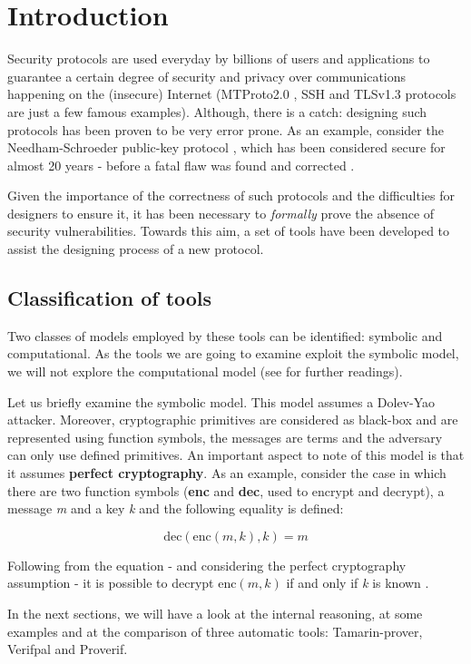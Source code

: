
\section{Introduction}
\label{section:introduction}

Security protocols are used everyday by billions of users and applications to guarantee a certain degree of security and privacy over communications happening on the (insecure) Internet (MTProto2.0 \cite{Telegram-MTProto2.0}, SSH \cite{rfc4251} and TLSv1.3 \cite{TLSv1.3_specs} protocols are just a few famous examples). Although, there is a catch: designing such protocols has been proven to be very error prone. As an example, consider the Needham-Schroeder public-key protocol \cite{NSPK}, which has been considered secure for almost 20 years - before a fatal flaw was found and corrected \cite{NSPK_LoweGavin}.

Given the importance of the correctness of such protocols and the difficulties for designers to ensure it, it has been necessary to \textit{formally} prove the absence of security vulnerabilities. Towards this aim, a set of tools have been developed to assist the designing process of a new protocol.

\subsection{Classification of tools}

Two classes of models employed by these tools can be identified: symbolic and computational. As the tools we are going to examine exploit the symbolic model, we will not explore the computational model (see \cite{ReconcilingComputationalSymbolic, SymbolicComputationalBlanchet, 10.1007/978-3-540-31987-0_12} for further readings). 

Let us briefly examine the symbolic model. This model assumes a Dolev-Yao \cite{Dolev-Yao} attacker. Moreover, cryptographic primitives are considered as black-box and are represented using function symbols, the messages are terms and the adversary can only use defined primitives. An important aspect to note of this model is that it assumes \textbf{perfect cryptography}. As an example, consider the case in which there are two function symbols (\textbf{enc} and \textbf{dec}, used to encrypt and decrypt), a message \textit{m} and a key \textit{k} and the following equality is defined:

\begin{equation}
\mbox{dec}\left(\mbox{enc}\left(m, k\right), k\right) = m
\end{equation}

Following from the equation - and considering the perfect cryptography assumption - it is possible to decrypt $\mbox{enc}\left(m, k\right)$ if and only if \textit{k} is known \cite{SymbolicComputationalBlanchet}.

In the next sections, we will have a look at the internal reasoning, at some examples and at the comparison of three automatic tools: Tamarin-prover, Verifpal and Proverif.